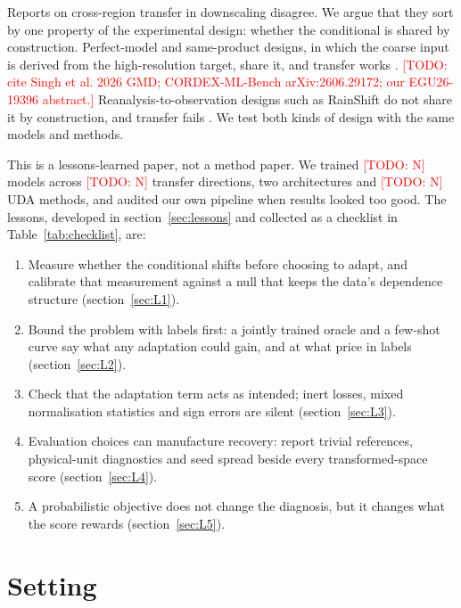 \documentclass{ametsocV6.2}
\newcommand{\todo}[1]{\textcolor{red}{[TODO: #1]}}
\begin{document}
Reports on cross-region transfer in downscaling disagree. We argue that
they sort by one property of the experimental design: whether the
conditional is shared by construction. Perfect-model and same-product
designs, in which the coarse input is derived from the high-resolution
target, share it, and transfer works \citep{qian2026}. \todo{cite Singh
et al. 2026 GMD; CORDEX-ML-Bench arXiv:2606.29172; our EGU26-19396
abstract.} Reanalysis-to-observation designs such as RainShift do not
share it by construction, and transfer fails
\citep{harder2025rainshift}. We test both kinds of design with the same
models and methods.

This is a lessons-learned paper, not a method paper. We trained \todo{N}
models across \todo{N} transfer directions, two architectures and
\todo{N} UDA methods, and audited our own pipeline when results looked
too good. The lessons, developed in section~\ref{sec:lessons} and
collected as a checklist in Table~\ref{tab:checklist}, are:
\begin{enumerate}
  \item Measure whether the conditional shifts before choosing to adapt,
        and calibrate that measurement against a null that keeps the
        data's dependence structure (section~\ref{sec:L1}).
  \item Bound the problem with labels first: a jointly trained oracle and
        a few-shot curve say what any adaptation could gain, and at what
        price in labels (section~\ref{sec:L2}).
  \item Check that the adaptation term acts as intended; inert losses,
        mixed normalisation statistics and sign errors are silent
        (section~\ref{sec:L3}).
  \item Evaluation choices can manufacture recovery: report trivial
        references, physical-unit diagnostics and seed spread beside every
        transformed-space score (section~\ref{sec:L4}).
  \item A probabilistic objective does not change the diagnosis, but it
        changes what the score rewards (section~\ref{sec:L5}).
\end{enumerate}

\section{Setting}\label{sec:setting}
\end{document}
